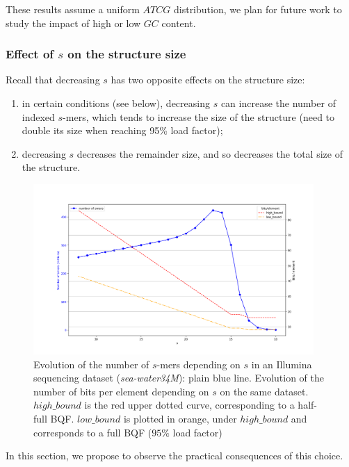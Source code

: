 These results assume a uniform $ATCG$ distribution, we plan for future work to study the impact of high or low $GC$ content.


\subsubsection{Effect of $s$ on the structure size}
Recall that decreasing $s$ has two opposite effects on the structure size: 
\begin{enumerate}[label=(\alph*)]
    \item in certain conditions (see below), decreasing $s$ can increase the number of indexed $s$-mers, which tends to increase the size of the structure (need to double its size when reaching 95\% load factor);
    \item decreasing $s$ decreases the remainder size, and so decreases the total size of the structure.
\end{enumerate}


\begin{figure}[ht]  
\centering  
\includegraphics[width=0.95\textwidth]{figures/paperII/fig_limit_fimpera_publi.png}  \hfill  
\caption{Evolution of the number of $s$-mers depending on $s$ in an Illumina sequencing dataset (\textit{sea-water34M}): plain blue line. Evolution of the number of bits per element depending on $s$ on the same dataset. $high\_bound$ is the red upper dotted curve, corresponding to a half-full BQF. $low\_bound$ is plotted in orange, under $high\_bound$ and corresponds to a full BQF ($95\%$ load factor)}
\label{fig:seffect}
\end{figure}

In this section, we propose to observe the practical consequences of this choice.

